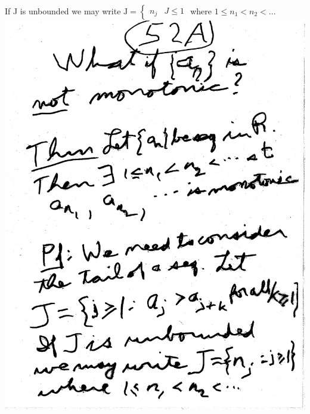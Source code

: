 \documentclass[10pt,a4paper]{article}
\begin{document}
{{If J is  unbounded we may write $\mbox{J} = \begin{cases} n_j & J\leq 1 \end{cases}$ where $1 \leq n_1 <n_2<...$
\includegraphics[scale=.5]{Pages/LC_7}

}}
\end{document}
